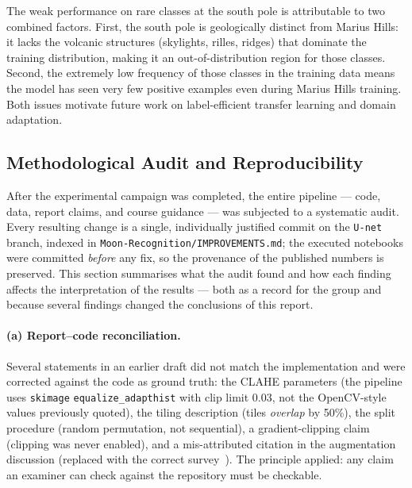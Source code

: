 \documentclass{aa}
\begin{document}
The weak performance on rare classes at the south pole is attributable to two combined factors. First, the south pole is geologically distinct from Marius Hills: it lacks the volcanic structures (skylights, rilles, ridges) that dominate the training distribution, making it an out-of-distribution region for those classes. Second, the extremely low frequency of those classes in the training data means the model has seen very few positive examples even during Marius Hills training. Both issues motivate future work on label-efficient transfer learning and domain adaptation.

\subsection{Methodological Audit and Reproducibility}
\label{sec:mr_audit}

After the experimental campaign was completed, the entire pipeline --- code, data, report claims, and course guidance --- was subjected to a systematic audit. Every resulting change is a single, individually justified commit on the \texttt{U-net} branch, indexed in \texttt{Moon-Recognition/IMPROVEMENTS.md}; the executed notebooks were committed \emph{before} any fix, so the provenance of the published numbers is preserved. This section summarises what the audit found and how each finding affects the interpretation of the results --- both as a record for the group and because several findings changed the conclusions of this report.

\paragraph{(a) Report--code reconciliation.}
Several statements in an earlier draft did not match the implementation and were corrected against the code as ground truth: the CLAHE parameters (the pipeline uses \texttt{skimage} \texttt{equalize\_adapthist} with clip limit 0.03, not the OpenCV-style values previously quoted), the tiling description (tiles \emph{overlap} by 50\%), the split procedure (random permutation, not sequential), a gradient-clipping claim (clipping was never enabled), and a mis-attributed citation in the augmentation discussion (replaced with the correct survey~\cite{shorten2019augmentation}). The principle applied: any claim an examiner can check against the repository must be checkable.
\end{document}
